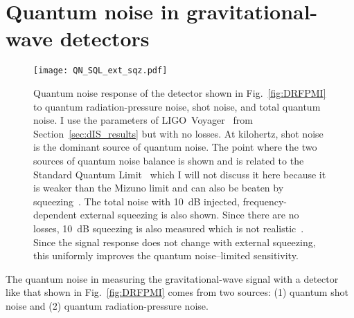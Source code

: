 

\section{Quantum noise in gravitational-wave detectors}
\label{sec:qnoise_GW_IFO}


\begin{figure}[ht]
	\centering
	\texttt{[image: QN\_SQL\_ext\_sqz.pdf]}
	\caption{ Quantum noise response of the detector shown in Fig.~\ref{fig:DRFPMI} to quantum radiation-pressure noise, shot noise, and total quantum noise. I use the parameters of LIGO~Voyager~\cite{} from Section~\ref{sec:dIS_results} but with no losses. At kilohertz, shot noise is the dominant source of quantum noise. The point where the two sources of quantum noise balance is shown and is related to the Standard Quantum Limit~\cite{} which I will not discuss it here because it is weaker than the Mizuno limit and can also be beaten by squeezing~\cite{}.
	The total noise with 10~dB injected, frequency-dependent external squeezing is also shown. Since there are no losses, 10~dB squeezing is also measured which is not realistic~\cite{}. Since the signal response does not change with external squeezing, this uniformly improves the quantum noise--limited sensitivity.	
	} %
	\label{fig:simplifed_QN_response_conventional}
\end{figure}

The quantum noise in measuring the gravitational-wave signal with a detector like that shown in Fig.~\ref{fig:DRFPMI} comes from two sources: (1) quantum shot noise and (2) quantum radiation-pressure noise.

